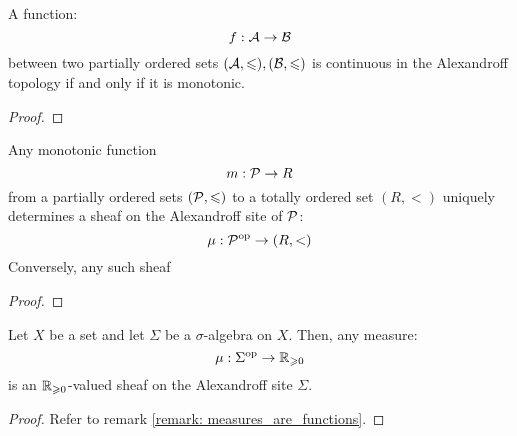         \begin{lemma} \label{lemma: continuity_of_monotonic_functions}
            A function:
                $$f: \mathcal{A} \to \mathcal{B}$$
            between two partially ordered sets $(\mathcal{A}, \leqslant), (\mathcal{B}, \leqslant)$ is continuous in the Alexandroff topology if and only if it is monotonic.
        \end{lemma}
            \begin{proof}
                
            \end{proof}
        \begin{theorem} \label{theorem: monotonic_functions_are_sheaves}
            Any monotonic function
                $$m: \mathcal{P} \to R$$
            from a partially ordered sets $(\mathcal{P}, \leqslant)$ to a totally ordered set $(R, <)$ uniquely determines a sheaf on the Alexandroff site of $\mathcal{P}$:
                $$\mu: \mathcal{P}^{\mathrm{op}} \to (R, <)$$
            Conversely, any such sheaf
        \end{theorem}
            \begin{proof}
                
            \end{proof}
        \begin{corollary} \label{coro: measures_are_sheaves}
            Let $X$ be a set and let $\Sigma$ be a $\sigma$-algebra on $X$. Then, any measure:
                $$\mu: \Sigma^{\mathrm{op}} \to \mathbb{R}_{\geqslant 0}$$
            is an $\mathbb{R}_{\geqslant 0}$-valued sheaf on the Alexandroff site $\Sigma$.
        \end{corollary}
            \begin{proof}
                Refer to remark \ref{remark: measures_are_functions}.
            \end{proof}
        
